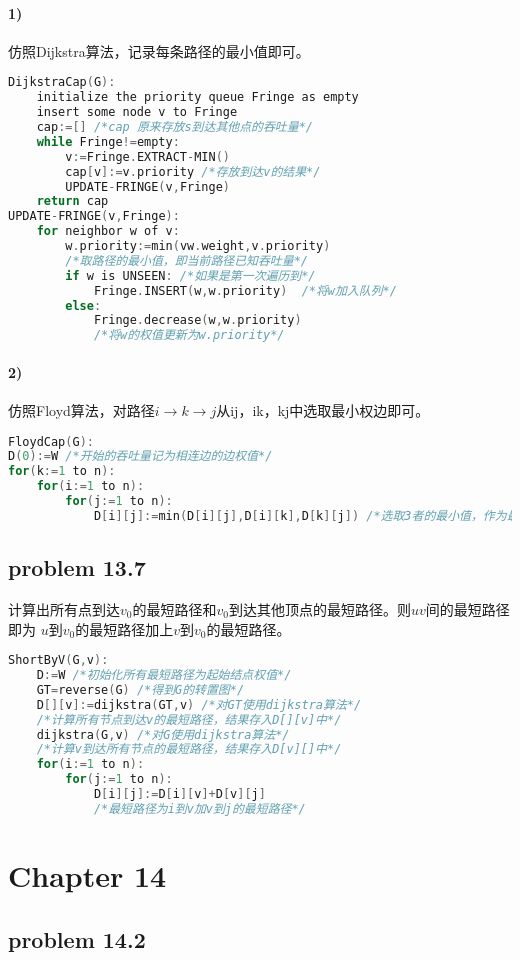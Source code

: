 \documentclass[11pt,a4paper,oneside,oldfontcommands]{ctexart}
\begin{document}
\paragraph*{1)}仿照Dijkstra算法，记录每条路径的最小值即可。
\begin{lstlisting}[language=C++,title=DijkstraCap.func]
DijkstraCap(G):
	initialize the priority queue Fringe as empty
	insert some node v to Fringe
	cap:=[] /*cap 原来存放s到达其他点的吞吐量*/
	while Fringe!=empty:
		v:=Fringe.EXTRACT-MIN()
		cap[v]:=v.priority /*存放到达v的结果*/
		UPDATE-FRINGE(v,Fringe)
	return cap
UPDATE-FRINGE(v,Fringe):
	for neighbor w of v:
		w.priority:=min(vw.weight,v.priority) 
		/*取路径的最小值，即当前路径已知吞吐量*/
		if w is UNSEEN: /*如果是第一次遍历到*/
			Fringe.INSERT(w,w.priority)  /*将w加入队列*/
		else:
			Fringe.decrease(w,w.priority) 
			/*将w的权值更新为w.priority*/
\end{lstlisting}
\paragraph*{2)}仿照Floyd算法，对路径$i \rightarrow k \rightarrow j$从ij，ik，kj中选取最小权边即可。
\begin{lstlisting}[language=C++,title=FloydCap.func]
FloydCap(G):
D(0):=W /*开始的吞吐量记为相连边的边权值*/
for(k:=1 to n):
	for(i:=1 to n):
		for(j:=1 to n):
			D[i][j]:=min(D[i][j],D[i][k],D[k][j]) /*选取3者的最小值，作为最大吞吐量*/
\end{lstlisting}
\newpage
{\subsection*{problem 13.7}}
计算出所有点到达$v_0$的最短路径和$v_0$到达其他顶点的最短路径。则$uv$间的最短路径即为
$u$到$v_0$的最短路径加上$v$到$v_0$的最短路径。
\begin{lstlisting}[language=C++,title=ShortByV.func]
ShortByV(G,v):
	D:=W /*初始化所有最短路径为起始结点权值*/
	GT=reverse(G) /*得到G的转置图*/
	D[][v]:=dijkstra(GT,v) /*对GT使用dijkstra算法*/
	/*计算所有节点到达v的最短路径，结果存入D[][v]中*/
	dijkstra(G,v) /*对G使用dijkstra算法*/
	/*计算v到达所有节点的最短路径，结果存入D[v][]中*/
	for(i:=1 to n):
		for(j:=1 to n):
			D[i][j]:=D[i][v]+D[v][j] 
			/*最短路径为i到v加v到j的最短路径*/
\end{lstlisting}
\section*{Chapter 14}
\hypertarget{14.2}{\subsection*{problem 14.2}}
\end{document}
